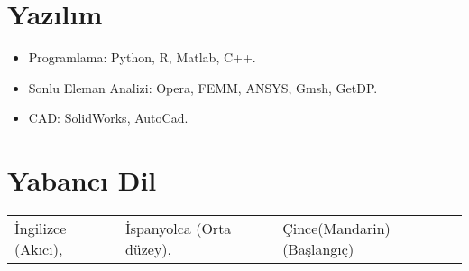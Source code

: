\documentclass[a4paper,12pt]{article}
\begin{document}
\section{Yazılım}
\begin{itemize}
\item Programlama: Python, R, Matlab, C++.
\item Sonlu Eleman Analizi: Opera, FEMM, ANSYS, Gmsh, GetDP.
\item CAD: SolidWorks, AutoCad.
\end{itemize}


\section{Yabancı Dil}
\begin{tabular}{lll} 
İngilizce (Akıcı), & İspanyolca (Orta düzey), & Çince(Mandarin) (Başlangıç)
\end{tabular}

\clearpage

\begin{publications}
\end{publications}


\end{document}
